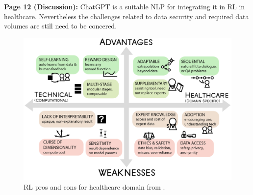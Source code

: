     \textbf{Page 12 (Discussion):}
    ChatGPT is a suitable NLP for integrating it in RL in healthcare. Nevertheless the challenges related to data security and required data volumes are still need to be concered. 
    \begin{figure}[H]
        \centering
        \includegraphics[width=1\textwidth]{figures/SR0022US23/fig6.png}
        \caption{RL pros and cons for healthcare domain from \cite{x090}.}
        \label{fig6:SR0022US23}
    \end{figure}